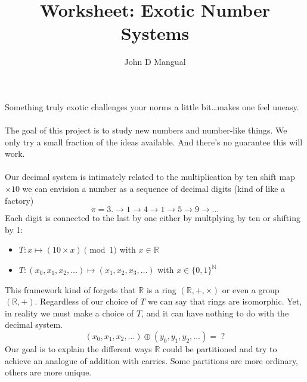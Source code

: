 \documentclass[12pt]{article}
\title{Worksheet: Exotic Number Systems}
\author{John D Mangual}
\date{}
\begin{document}
\selectfont \fontsize{12.5}{15}\selectfont

\maketitle

\noindent Something truly exotic challenges your norms a little bit\dots makes one feel uneasy. \\ \\
The goal of this project is to study new numbers and number-like things.  We only try a small fraction of the ideas available. And there's no guarantee this will work. \\ \\
Our decimal system is intimately related to the multiplication by ten shift map $\times 10$ we can envision a number as a sequence of decimal digits (kind of like a factory)
$$ \pi = 3. \to  1 \to 4 \to 1 \to 5 \to 9 \to \dots $$
Each digit is connected to the last by one either by multplying by ten or shifting by 1:
\begin{itemize}
\item $T: x \mapsto (10 \times x ) \pmod 1 $  with  $x \in \mathbb{R}$\\ 
\item $T: (x_0, x_1, x_2, \dots ) \mapsto (x_1, x_2, x_3, \dots ) $ with $x \in \{0,1\}^\mathbb{N}$
\end{itemize}
This framework kind of forgets that $\mathbb{R}$ is a ring $(\mathbb{R}, + , \times)$ or even a group $(\mathbb{R}, +)$.  Regardless of our choice of $T$ we can say that rings are isomorphic. Yet, in reality we must make a choice of $T$, and it can have nothing to do with the decimal system.
$$ (x_0, x_1, x_2, \dots ) \oplus (y_0, y_1, y_2, \dots ) = \;? $$
Our goal is to explain the different ways $\mathbb{R}$ could be partitioned and try to achieve an analogue of addition with carries.  Some partitions are more ordinary, others are more unique. 

\newpage
\end{document}
